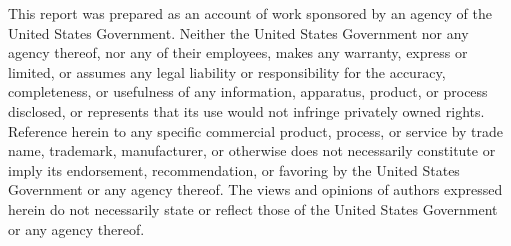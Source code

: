 \documentclass[preprint,12pt]{elsarticle}
\begin{document}
This report was prepared as an account of work sponsored by an agency of the United States Government. Neither the United States Government nor any agency thereof, nor any of their employees, makes any warranty, express or limited, or assumes any legal liability or responsibility for the accuracy, completeness, or usefulness of any information, apparatus, product, or process disclosed, or represents that its use would not infringe privately owned rights. Reference herein to any specific commercial product, process, or service by trade name, trademark, manufacturer, or otherwise does not necessarily constitute or imply its endorsement, recommendation, or favoring by the United States Government or any agency thereof. The views and opinions of authors expressed herein do not necessarily state or reflect those of the United States Government or any agency thereof.



\end{document}

